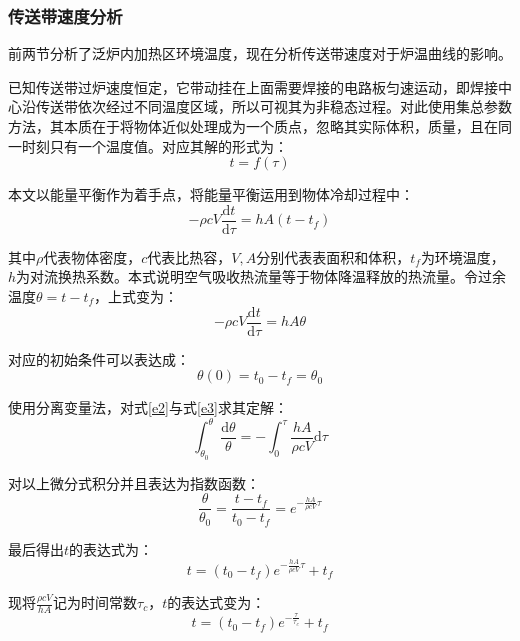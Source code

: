 \documentclass[a4paper,12pt]{ctexart} %
\begin{document}
	\subsubsection{ 传送带速度分析}
	前两节分析了泛炉内加热区环境温度，现在分析传送带速度对于炉温曲线的影响。\par
	已知传送带过炉速度恒定，它带动挂在上面需要焊接的电路板匀速运动，即焊接中心沿传送带依次经过不同温度区域，所以可视其为非稳态过程。对此使用集总参数方法\cite{ref2}，其本质在于将物体近似处理成为一个质点，忽略其实际体积，质量，且在同一时刻只有一个温度值。对应其解的形式为：
	\begin{equation}
	t=f\left(\tau\right)
	\end{equation}\par
	本文以能量平衡作为着手点，将能量平衡运用到物体冷却过程中：
	\begin{equation}
	-\rho cV\dfrac{\mathrm{d}t}{\mathrm{d}\tau}=hA\left(t-t_f\right)
	\end{equation}\par
	其中$\rho$代表物体密度，$c$代表比热容，$V,A$分别代表表面积和体积，$t_f$为环境温度，$h$为对流换热系数。本式说明空气吸收热流量等于物体降温释放的热流量。令过余温度$\theta=t-t_f$，上式变为：
	\begin{equation}\label{e2}
	-\rho cV\dfrac{\mathrm{d}t}{\mathrm{d}\tau}=hA\theta
	\end{equation}\par
	对应的初始条件可以表达成：
	\begin{equation}\label{e3}
	\theta\left(0\right)=t_0-t_f=\theta_0
	\end{equation}\par
	使用分离变量法，对式\ref{e2}与式\ref{e3}求其定解：
	\begin{equation}
	\int_{\theta_0}^{\theta}\dfrac{\mathrm{d}\theta}{\theta}=-\int_{0}^{\tau}\dfrac{hA}{\rho cV}\mathrm{d}\tau
	\end{equation}\par
	对以上微分式积分并且表达为指数函数：
	\begin{equation}
	\frac{\theta}{\theta_0}=\frac{t-t_f}{t_0-t_f}=e^{-\frac{hA}{\rho cV}\tau}
	\end{equation}\par
	最后得出$t$的表达式为：
	\begin{equation}
	t=\left(t_0-t_f\right)e^{-\frac{hA}{\rho cV}\tau}+t_f
	\end{equation}\par
	现将$\frac{\rho cV}{hA}$记为时间常数$\tau_c$，$t$的表达式变为：
	\begin{equation}\label{e4}
	t=\left(t_0-t_f\right)e^{-\frac{\tau}{\tau_c}}+t_f
	\end{equation}\par
\end{document}
